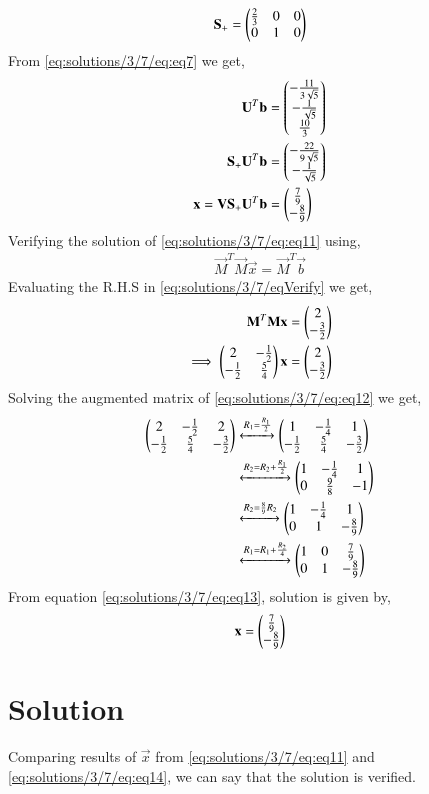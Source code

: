 \begin{align}
\mathbf{S_+} = \begin{pmatrix}\frac{2}{3}&0&0\\0&1&0\end{pmatrix}
\end{align}
From \eqref{eq:solutions/3/7/eq:eq7} we get,
\begin{align}
\mathbf{U}^T\mathbf{b}&=\begin{pmatrix}-\frac{11}{3\sqrt{5}}\\-\frac{1}{\sqrt{5}}\\\frac{10}{3}\end{pmatrix}\\
\mathbf{S_+}\mathbf{U}^T\mathbf{b}&=\begin{pmatrix}-\frac{22}{9\sqrt{5}}\\-\frac{1}{\sqrt{5}}\end{pmatrix}\\
\mathbf{x} = \mathbf{V}\mathbf{S_+}\mathbf{U}^T\mathbf{b} &= \begin{pmatrix}\frac{7}{9}\\-\frac{8}{9}\end{pmatrix} \label{eq:solutions/3/7/eq:eq11}
\end{align}
Verifying the solution of \eqref{eq:solutions/3/7/eq:eq11} using,
\begin{align}
\vec{M}^T\vec{M}\vec{x} = \vec{M}^T\vec{b}\label{eq:solutions/3/7/eqVerify}
\end{align}
Evaluating the R.H.S in \eqref{eq:solutions/3/7/eqVerify} we get,
\begin{align}
\mathbf{M}^T\mathbf{M}\mathbf{x} &= \begin{pmatrix}2\\-\frac{3}{2}\end{pmatrix}\\
\implies\begin{pmatrix}2&-\frac{1}{2}\\-\frac{1}{2}&\frac{5}{4}\end{pmatrix}\mathbf{x} &= \begin{pmatrix}2\\-\frac{3}{2}\end{pmatrix}\label{eq:solutions/3/7/eq:eq12}
\end{align}
Solving the augmented matrix of \eqref{eq:solutions/3/7/eq:eq12} we get,
\begin{align}
\begin{pmatrix}2&-\frac{1}{2}&2\\-\frac{1}{2}&\frac{5}{4}&-\frac{3}{2}\end{pmatrix} &\xleftrightarrow{R_1=\frac{R_1}{2}}\begin{pmatrix}1&-\frac{1}{4}&1\\-\frac{1}{2}&\frac{5}{4}&-\frac{3}{2}\end{pmatrix}\\
&\xleftrightarrow{R_2=R_2+\frac{R_1}{2}}\begin{pmatrix}1&-\frac{1}{4}&1\\0&\frac{9}{8}&-1\end{pmatrix}\\
&\xleftrightarrow{R_2=\frac{8}{9}R_2}\begin{pmatrix}1&-\frac{1}{4}&1\\0&1&-\frac{8}{9}\end{pmatrix}\\
&\xleftrightarrow{R_1=R_1+\frac{R_2}{4}}\begin{pmatrix}1&0&\frac{7}{9}\\0&1&-\frac{8}{9}\end{pmatrix}\label{eq:solutions/3/7/eq:eq13}
\end{align}
From equation \eqref{eq:solutions/3/7/eq:eq13}, solution is given by,
\begin{align}
\mathbf{x}=\begin{pmatrix}\frac{7}{9}\\-\frac{8}{9}\end{pmatrix}\label{eq:solutions/3/7/eq:eq14}
\end{align}
\section{Solution}
Comparing results of $\vec{x}$ from \eqref{eq:solutions/3/7/eq:eq11} and \eqref{eq:solutions/3/7/eq:eq14}, we can say that the solution is verified.
